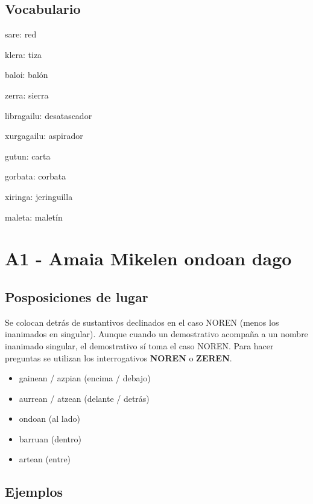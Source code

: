\documentclass[11pt, a4paper]{article}
\begin{document}
\subsection{Vocabulario}
\begin{itemize}
\begin{multicols}{2}
\item sare: red
\item klera: tiza
\item baloi: balón
\item zerra: sierra
\item libragailu: desatascador
\item xurgagailu: aspirador
\item gutun: carta
\item gorbata: corbata
\item xiringa: jeringuilla
\item maleta: maletín
\end{multicols}
\end{itemize}

\section{A1 - Amaia Mikelen ondoan dago}

\subsection{Posposiciones de lugar}
\noindent Se colocan detrás de sustantivos declinados en el caso NOREN (menos los inanimados en singular). Aunque cuando un demostrativo acompaña a un nombre inanimado singular, el demostrativo sí toma el caso NOREN. Para hacer preguntas se utilizan los interrogativos \textbf{NOREN} o \textbf{ZEREN}.

\begin{itemize}
\item gainean / azpian (encima / debajo)
\item aurrean / atzean (delante / detrás)
\item ondoan (al lado)
\item barruan (dentro)
\item artean (entre)
\end{itemize}

\subsection{Ejemplos}
\end{document}
